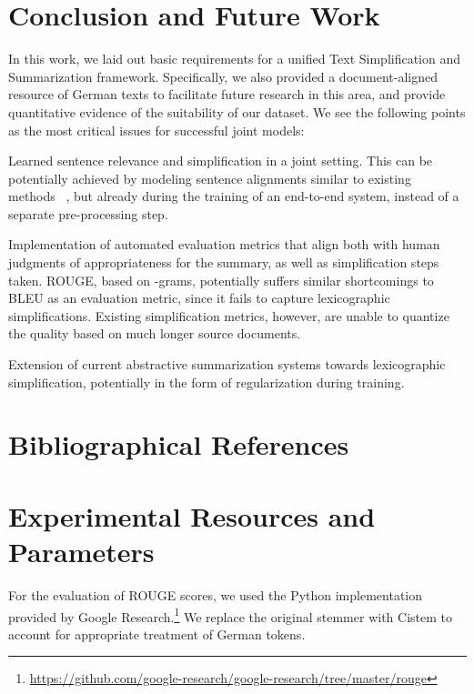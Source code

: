 \documentclass[10pt, a4paper]{article}
\begin{document}
\section{Conclusion and Future Work}
In this work, we laid out basic requirements for a unified Text Simplification and Summarization framework.
Specifically, we also provided a document-aligned resource of German texts to facilitate future research in this area, and provide quantitative evidence of the suitability of our dataset.
We see the following points as the most critical issues for successful joint models:
\begin{inparaenum}[i)]
	\item Learned sentence relevance and simplification in a joint setting. This can be potentially achieved by modeling sentence alignments similar to existing methods~ \cite{stajner-etal-2018-cats,jiang-etal-2020-neural}, but already during the training of an end-to-end system, instead of a separate pre-processing step.
	\item Implementation of automated evaluation metrics that align both with human judgments of appropriateness for the summary, as well as simplification steps taken. ROUGE, based on -grams, potentially suffers similar shortcomings to BLEU as an evaluation metric, since it fails to capture lexicographic simplifications. Existing simplification metrics, however, are unable to quantize the quality based on much longer source documents.
	\item Extension of current abstractive summarization systems towards lexicographic simplification, potentially in the form of regularization during training.
\end{inparaenum}








\section{Bibliographical References}\label{reference}








\appendix
\section{Experimental Resources and Parameters}
For the evaluation of ROUGE scores, we used the Python implementation provided by Google Research.\footnote{\url{https://github.com/google-research/google-research/tree/master/rouge}}
We replace the original stemmer with Cistem \cite{weissweiler2017developing} to account for appropriate treatment of German tokens.
\end{document}
